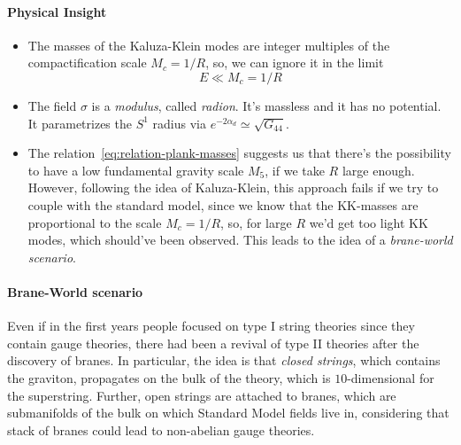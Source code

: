 \paragraph{Physical Insight}
\begin{itemize}
    \item The masses of the Kaluza-Klein modes are integer multiples of the compactification scale $M_c = 1 / R$, so, we can ignore it in the limit
    \begin{equation}
        E \ll M_c = 1/R
    \end{equation}
    \item The field $\sigma$ is a \emph{modulus}, called \emph{radion}. It's massless and it has no potential. It parametrizes the $S^1$ radius via $e^{-2\alpha_d} \simeq \sqrt{G_{44}}$.
    \item The relation~\eqref{eq:relation-plank-masses} suggests us that there's the possibility to have a low fundamental gravity scale $M_5$, if we take $R$ large enough. However, following the idea of Kaluza-Klein, this approach fails if we try to couple with the standard model, since we know that the KK-masses are proportional to the scale $M_c = 1/R$, so, for large $R$ we'd get too light KK modes, which should've been observed. This leads to the idea of a \emph{brane-world scenario}.
\end{itemize}

\paragraph{Brane-World scenario}
Even if in the first years people focused on type I string theories since they contain gauge theories, there had been a revival of type II theories after the discovery of branes. In particular, the idea is that \emph{closed strings}, which contains the graviton, propagates on the bulk of the theory, which is $10$-dimensional for the superstring. Further, open strings are attached to branes, which are submanifolds of the bulk on which Standard Model fields live in, considering that stack of branes could lead to non-abelian gauge theories. 

